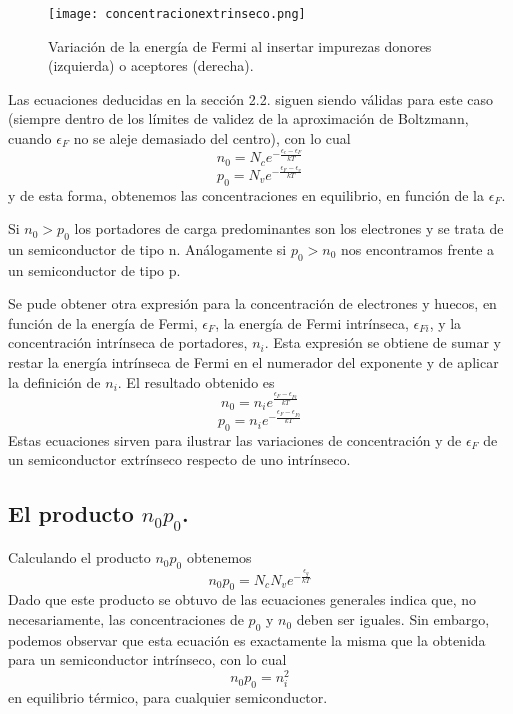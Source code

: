 \documentclass[12pt,a4paper]{article}
\begin{document}
\begin{figure}[ht!]
\begin{center}
\texttt{[image: concentracionextrinseco.png]}
\caption{Variación de la energía de Fermi al insertar impurezas donores (izquierda) o aceptores (derecha).}
\end{center}
\end{figure}

Las ecuaciones deducidas en la sección 2.2. siguen siendo válidas para este caso (siempre dentro de los límites de validez de la aproximación de Boltzmann, cuando $\epsilon _{F}$ no se aleje demasiado del centro), con lo cual
\[ n_{0} = N_{c} e^{-\frac{\epsilon _{c} - \epsilon _{F}}{kT}} \]
\[ p_{0} = N_{v} e^{-\frac{\epsilon _{F} - \epsilon _{v}}{kT}} \]
y de esta forma, obtenemos las concentraciones en equilibrio, en función de la $\epsilon _{F}$.

Si $n_{0}>p_{0}$ los portadores de carga predominantes son los electrones y se trata de un semiconductor de tipo n. Análogamente si $p_{0}>n_{0}$ nos encontramos frente a un semiconductor de tipo p.

Se pude obtener otra expresión para la concentración de electrones y huecos, en función de la energía de Fermi, $\epsilon _{F}$, la energía de Fermi intrínseca, $\epsilon _{Fi}$, y la concentración intrínseca de portadores, $n_{i}$. Esta expresión se obtiene de sumar y restar la energía intrínseca de Fermi en el numerador del exponente y de aplicar la definición de $n_{i}$. El resultado obtenido es
\[ n_{0} = n_{i} e^{\frac{\epsilon _{F} - \epsilon _{Fi}}{kT}} \]
\[ p_{0} = n_{i} e^{-\frac{\epsilon _{F} - \epsilon _{Fi}}{kT}} \]
Estas ecuaciones sirven para ilustrar las variaciones de concentración y de $\epsilon _{F}$ de un semiconductor extrínseco respecto de uno intrínseco.

\subsection{El producto $n_{0}p_{0}$.}

Calculando el producto $n_{0}p_{0}$ obtenemos
\[ n_{0}p_{0} = N_{c}N_{v} e^{-\frac{\epsilon _{g}}{kT}} \]
Dado que este producto se obtuvo de las ecuaciones generales indica que, no necesariamente, las concentraciones de $p_{0}$ y $n_{0}$ deben ser iguales. Sin embargo, podemos observar que esta ecuación es exactamente la misma que la obtenida para un semiconductor intrínseco, con lo cual
\[ n_{0}p_{0} = n_{i}^{2} \]
en equilibrio térmico, para cualquier semiconductor.
\end{document}
